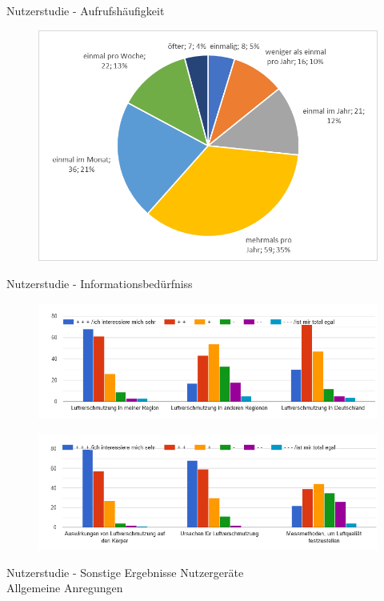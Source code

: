 \begin{frame}{Nutzerstudie - Aufrufshäufigkeit}
    \begin{figure}[h]
        \includegraphics[height=0.7\textheight]{../../media/diagram/aufrufe}
    \end{figure}
\end{frame}
\begin{frame}{Nutzerstudie - Informationsbedürfniss}
    \begin{figure}[h]
        \includegraphics[height=0.35\textheight]{../../media/diagram/interesse}
    \end{figure}
    \begin{figure}[h]
        \includegraphics[height=0.35\textheight]{../../media/diagram/interesse2}
    \end{figure}
\end{frame}
\begin{frame}{Nutzerstudie - Sonstige Ergebnisse}
    \centering
    Nutzergeräte
    \\
    \vspace{1cm}
    Allgemeine Anregungen
\end{frame}